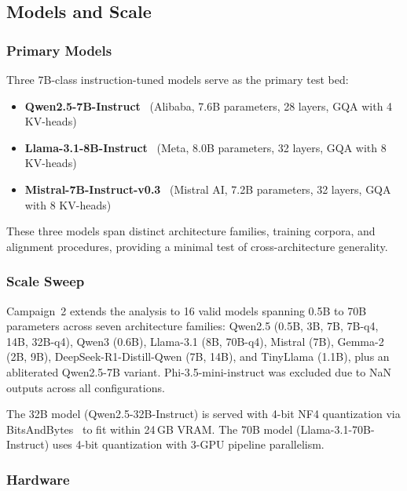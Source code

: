 \subsection{Models and Scale}
\label{sec:models-scale}

\subsubsection{Primary Models}

Three 7B-class instruction-tuned models serve as the primary test bed:
\begin{itemize}[leftmargin=2em]
  \item \textbf{Qwen2.5-7B-Instruct}~\cite{qwen2.5} (Alibaba, 7.6B parameters, 28 layers, GQA with 4 KV-heads)
  \item \textbf{Llama-3.1-8B-Instruct}~\cite{llama3} (Meta, 8.0B parameters, 32 layers, GQA with 8 KV-heads)
  \item \textbf{Mistral-7B-Instruct-v0.3}~\cite{mistral7b} (Mistral AI, 7.2B parameters, 32 layers, GQA with 8 KV-heads)
\end{itemize}
These three models span distinct architecture families, training corpora, and alignment procedures, providing a minimal test of cross-architecture generality.

\subsubsection{Scale Sweep}

Campaign~2 extends the analysis to 16 valid models spanning 0.5B to 70B parameters across seven architecture families: Qwen2.5 (0.5B, 3B, 7B, 7B-q4, 14B, 32B-q4), Qwen3 (0.6B), Llama-3.1 (8B, 70B-q4), Mistral (7B), Gemma-2 (2B, 9B), DeepSeek-R1-Distill-Qwen (7B, 14B), and TinyLlama (1.1B), plus an abliterated Qwen2.5-7B variant.
Phi-3.5-mini-instruct was excluded due to NaN outputs across all configurations.

The 32B model (Qwen2.5-32B-Instruct) is served with 4-bit NF4 quantization via BitsAndBytes~\cite{bitsandbytes} to fit within 24\,GB VRAM.
The 70B model (Llama-3.1-70B-Instruct) uses 4-bit quantization with 3-GPU pipeline parallelism.

\subsubsection{Hardware}


